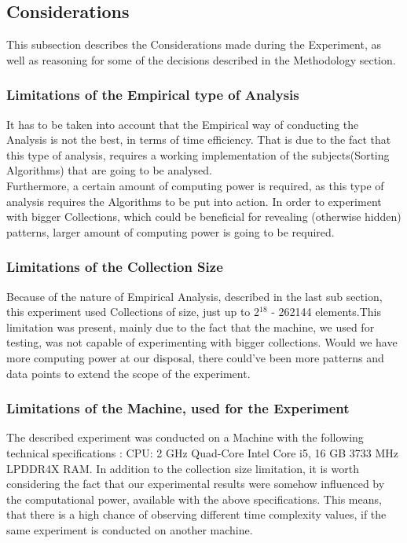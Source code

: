 \documentclass[]{report}
\begin{document}
\subsection{Considerations}
This subsection describes the Considerations made during the Experiment, as well as reasoning for some of the decisions described in the Methodology section.
\subsubsection{Limitations of the Empirical type of Analysis}
It has to be taken into account that the Empirical way of conducting the Analysis is not the best, in terms of time efficiency. That is due to the fact that this type of analysis, requires a working implementation of the subjects(Sorting Algorithms) that are going to be analysed. \\
Furthermore, a certain amount of computing power is required, as this type of analysis requires the Algorithms to be put into action. In order to experiment with bigger Collections, which could be beneficial for revealing (otherwise hidden) patterns, larger amount of computing power is going to be required. 

\subsubsection{Limitations of the Collection Size}
Because of the nature of Empirical Analysis, described in the last sub section, this experiment used Collections of size, just up to 2$^{18}$ - 262144 elements.This limitation was present, mainly due to the fact that the machine, we used for testing, was not capable of experimenting with bigger collections. Would we have more computing power at our disposal, there could've been more patterns and data points to extend the scope of the experiment.
\subsubsection{Limitations of the Machine, used for the Experiment}
The described experiment was conducted on a Machine with the following technical specifications : CPU: 2 GHz Quad-Core Intel Core i5, 16 GB 3733 MHz LPDDR4X RAM. In addition to the collection size limitation, it is worth considering the fact that our experimental results were somehow influenced by the computational power, available with the above specifications. This means, that there is a high chance of observing different time complexity values, if the same experiment is conducted on another machine.
\end{document}

